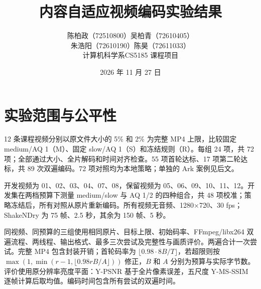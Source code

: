 \documentclass[UTF8,10pt,a4paper]{ctexart}
\title{内容自适应视频编码实验结果}
\author{陈柏政（72510800）\quad 吴柏青（72610405）\\朱浩阳（72610190）\quad 陈昊（72611033）\\计算机科学系\quad CS5185 课程项目}
\date{2026 年 11 月 27 日}
\begin{document}
\maketitle
\section{实验范围与公平性}
12 条课程视频分别以原文件大小的 5\% 和 2\% 为完整 MP4 上限，比较固定 medium/AQ 1（M）、固定 slow/AQ 1（S）和冻结规则（R）。每组 24 项，共 72 项；全部通过大小、全片解码和时间对齐检查。55 项首轮达标、17 项第二轮达标，共 89 次双遍编码。72 项对照均为本地策略；单独的 Ark 案例见后文。

开发视频为 01、02、03、04、07、08，保留视频为 05、06、09、10、11、12。开发集在两档预算下测量 medium/slow 与 AQ 1/2 的四种组合，共 48 项校准；策略冻结后，所有对照从原片重新编码。所有视频无音频、1280×720、30 fps；ShakeNDry 为 75 帧、2.5 秒，其余为 150 帧、5 秒。

同视频、同预算的三组使用相同原片、目标上限、初始码率、FFmpeg/libx264 双遍流程、两线程、输出格式、最多三次尝试及完整性与画质评价。两遍合计一次尝试。完整 MP4 包含封装开销；首轮码率为 $\lfloor0.98\cdot8B/T\rfloor$，若超限则按 $\max(1,\min(r-1,\lfloor0.98rB/A\rfloor))$ 修正，$B$ 和 $A$ 分别为预算与实际字节数。评价使用原分辨率亮度平面：Y-PSNR 基于全片像素误差，五尺度 Y-MS-SSIM 逐帧计算后取均值。编码时间包含所有尝试的双遍时间。
\end{document}
